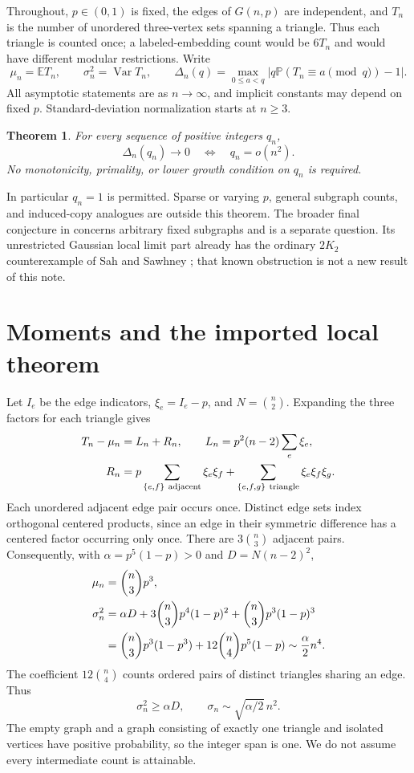 \documentclass[11pt]{article}
\newtheorem{theorem}{Theorem}
\newcommand{\Pp}{\mathbb P}
\newcommand{\Ee}{\mathbb E}
\newcommand{\Var}{\operatorname{Var}}
\begin{document}
Throughout, \(p\in(0,1)\) is fixed, the edges of \(G(n,p)\) are independent,
and \(T_n\) is the number of unordered three-vertex sets spanning a triangle.
Thus each triangle is counted once; a labeled-embedding count would be
\(6T_n\) and would have different modular restrictions. Write
\[
 \mu_n=\Ee T_n,\qquad \sigma_n^2=\Var T_n,\qquad
 \Delta_n(q)=\max_{0\leq a<q}
       \left|q\Pp(T_n\equiv a\pmod q)-1\right|.
\]
All asymptotic statements are as \(n\to\infty\), and implicit constants may
depend on fixed \(p\). Standard-deviation normalization starts at \(n\geq3\).

\begin{theorem}\label{thm:main}
For every sequence of positive integers \(q_n\),
\[
 \Delta_n(q_n)\longrightarrow0
       \quad\Longleftrightarrow\quad q_n=o(n^2).
\]
No monotonicity, primality, or lower growth condition on \(q_n\) is required.
\end{theorem}

In particular \(q_n=1\) is permitted. Sparse or varying \(p\), general
subgraph counts, and induced-copy analogues are outside this theorem.
The broader final conjecture in \cite{ST} concerns arbitrary fixed
subgraphs and is a separate question. Its unrestricted Gaussian local
limit part already has the ordinary \(2K_2\) counterexample of Sah and
Sawhney \cite[Theorem~1.3]{SS}; that known obstruction is not a new result
of this note.

\section{Moments and the imported local theorem}

Let \(I_e\) be the edge indicators, \(\xi_e=I_e-p\), and
\(N=\binom n2\). Expanding the three factors for each triangle gives
\begin{align}
 T_n-\mu_n&=L_n+R_n,\qquad
 L_n=p^2(n-2)\sum_e\xi_e, \label{eq:projection}\\
 R_n&=p\sum_{\{e,f\}\ {\rm adjacent}}\xi_e\xi_f
         +\sum_{\{e,f,g\}\ {\rm triangle}}\xi_e\xi_f\xi_g. \notag
\end{align}
Each unordered adjacent edge pair occurs once. Distinct edge sets index
orthogonal centered products, since an edge in their symmetric difference
has a centered factor occurring only once. There are \(3\binom n3\)
adjacent pairs. Consequently, with \(\alpha=p^5(1-p)>0\) and
\(D=N(n-2)^2\),
\begin{align}
 \mu_n&=\binom n3p^3, \notag\\
 \sigma_n^2
 &=\alpha D+3\binom n3p^4(1-p)^2+\binom n3p^3(1-p)^3 \label{eq:variance}\\
 &=\binom n3p^3(1-p^3)+12\binom n4p^5(1-p)
       \sim\frac{\alpha}{2}n^4. \notag
\end{align}
The coefficient \(12\binom n4\) counts ordered pairs of distinct triangles
sharing an edge. Thus
\begin{equation}\label{eq:scale}
 \sigma_n^2\geq\alpha D,\qquad
 \sigma_n\sim\sqrt{\alpha/2}\,n^2.
\end{equation}
The empty graph and a graph consisting of exactly one triangle and isolated
vertices have positive probability, so the integer span is one. We do not
assume every intermediate count is attainable.
\end{document}
